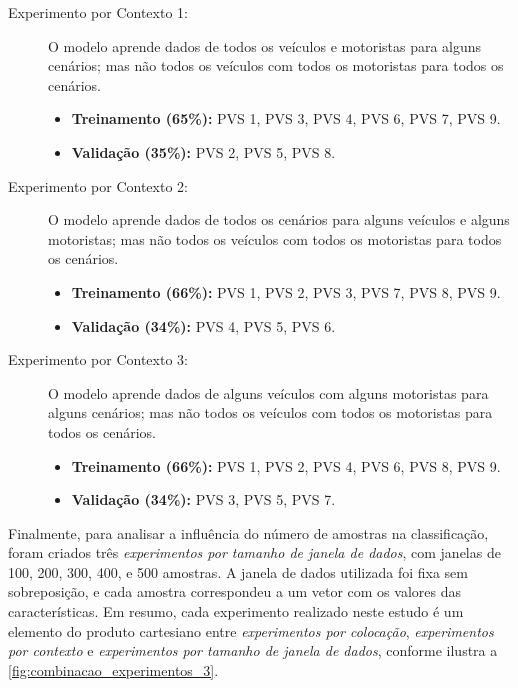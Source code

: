\begin{description}
	
	\item[Experimento por Contexto 1:] O modelo aprende dados de todos os veículos e motoristas para alguns cenários; mas não todos os veículos com todos os motoristas para todos os cenários.
    \begin{itemize}
        \item \textbf{Treinamento (65\%):} PVS 1, PVS 3, PVS 4, PVS 6, PVS 7, PVS 9. 
        \item \textbf{Validação (35\%):} PVS 2, PVS 5, PVS 8.
    \end{itemize}
    
    \item[Experimento por Contexto 2:] O modelo aprende dados de todos os cenários para alguns veículos e alguns motoristas; mas não todos os veículos com todos os motoristas para todos os cenários.
    \begin{itemize}
        \item \textbf{Treinamento (66\%):} PVS 1, PVS 2, PVS 3, PVS 7, PVS 8, PVS 9.
        \item \textbf{Validação (34\%):} PVS 4, PVS 5, PVS 6.
    \end{itemize}
    
    \item[Experimento por Contexto 3:] O modelo aprende dados de alguns veículos com alguns motoristas para alguns cenários; mas não todos os veículos com todos os motoristas para todos os cenários.
    \begin{itemize}
        \item \textbf{Treinamento (66\%):} PVS 1, PVS 2, PVS 4, PVS 6, PVS 8, PVS 9.
        \item \textbf{Validação (34\%):} PVS 3, PVS 5, PVS 7.
    \end{itemize}
    
\end{description}

Finalmente, para analisar a influência do número de amostras na classificação, foram criados três \emph{experimentos por tamanho de janela de dados}, com janelas de 100, 200, 300, 400, e 500 amostras. A janela de dados utilizada foi fixa sem sobreposição, e cada amostra correspondeu a um vetor com os valores das características. Em resumo, cada experimento realizado neste estudo é um elemento do produto cartesiano entre \emph{experimentos por colocação}, \emph{experimentos por contexto} e \emph{experimentos por tamanho de janela de dados}, conforme ilustra a \autoref{fig:combinacao_experimentos_3}.

